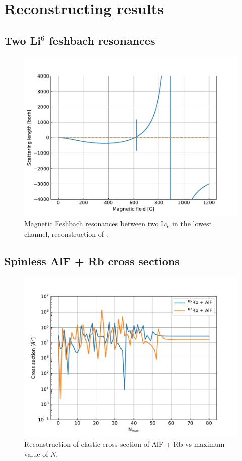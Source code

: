 \documentclass[a4paper]{article}
\begin{document}
\section{Reconstructing results}
\subsection{Two Li\(^6\) feshbach resonances}
    \begin{figure}[H]
        \centering
        \includegraphics[width = 0.7\columnwidth]{li2_feshbach.pdf}
        \caption{Magnetic Feshbach resonances between two Li$_6$ in the lowest channel, 
            reconstruction of \cite{julienne2014contrasting}.
        }
        \label{fig:li6_feshbach}
    \end{figure}

\subsection{Spinless AlF + Rb cross sections}
    \begin{figure}[H]
        \centering
        \includegraphics[width = 0.7\columnwidth]{spinless_AlF_Rb_n_max_dependence.pdf}
        \caption{Reconstruction of elastic cross section of AlF + Rb vs maximum value of \(N\).}
        \label{fig:alf_rb_sections}
    \end{figure}
\end{document}
